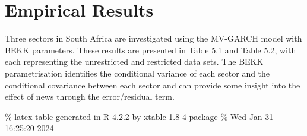 \documentclass[11pt,preprint, authoryear]{elsarticle}
\numberwithin{equation}{section}
\numberwithin{figure}{section}
\numberwithin{table}{section}
\begin{document}
\hypertarget{empirical-results}{%
\section{Empirical Results}\label{empirical-results}}

Three sectors in South Africa are investigated using the MV-GARCH model
with BEKK parameters. These results are presented in Table 5.1 and Table
5.2, with each representing the unrestricted and restricted data sets.
The BEKK parametrisation identifies the conditional variance of each
sector and the conditional covariance between each sector and can
provide some insight into the effect of news through the error/residual
term.

\% latex table generated in R 4.2.2 by xtable 1.8-4 package \% Wed Jan
31 16:25:20 2024
\end{document}
